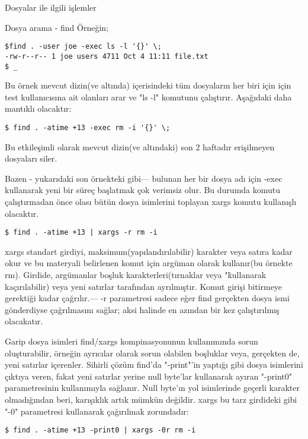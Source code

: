 \begin{section}{Dosyalar ile ilgili işlemler}
\begin{subsection}{Dosya arama - find}
Örneğin;
\begin{verbatim}
$find . -user joe -exec ls -l '{}' \;
-rw-r--r-- 1 joe users 4711 Oct 4 11:11 file.txt
$ _
\end{verbatim}

Bu örnek mevcut dizin(ve altında) içerisindeki tüm dosyaların her biri için için test kullanıcısına ait olanları arar ve "ls -l" komutunu çalıştırır. Aşağıdaki daha mantıklı olacaktır:

\begin{verbatim}
$ find . -atime +13 -exec rm -i '{}' \; 
\end{verbatim}

Bu etkileşimli olarak mevcut dizin(ve altındaki) son 2 haftadır erişilmeyen dosyaları siler.

Bazen - yukarıdaki son örnekteki gibi— bulunan her bir dosya adı için -exec kullanarak yeni bir süreç başlatmak çok verimsiz olur. Bu durumda komutu çalıştırmadan önce olası bütün dosya isimlerini toplayan xargs komutu kullanışlı olacaktır.
\begin{verbatim}
$ find . -atime +13 | xargs -r rm -i
\end{verbatim}
xargs standart girdiyi,  maksimum(yapılandırılabilir) karakter veya satıra kadar okur ve bu materyali belirlenen komut için argüman olarak kullanır(bu örnekte rm). Girdide, argümanlar boşluk karakterleri(tırnaklar veya "\" kullanarak kaçırılabilir) veya yeni satırlar tarafından ayrılmıştır. Komut girişi bitirmeye gerektiği kadar çağrılır.— -r parametresi sadece eğer find gerçekten dosya ismi gönderdiyse çağrılmasını sağlar; aksi halinde en azından bir kez çalıştırılmış olacakatır.

Garip dosya isimleri find/xargs kompinasyonunun kullanımında sorun oluşturabilir, örneğin ayrıcılar olarak sorun olabilen boşluklar veya, gerçekten de, yeni satırlar içerenler. Sihirli çözüm find'da "-print"'in yaptığı gibi dosya isimlerini çıktıya veren, fakat yeni satırlar yerine null byte'lar kullanarak ayıran "-print0" parametresinin kullanımıyla sağlanır. Null byte'ın yol isimlerinde geçerli karakter olmadığından beri, karışıklık artık mümkün değildir. xargs bu tarz girdideki gibi "-0" parametresi kullanarak çağırılmak zorundadır:
\begin{verbatim}
$ find . -atime +13 -print0 | xargs -0r rm -i
\end{verbatim}


\end{subsection}
\end{section}

